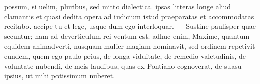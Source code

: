 possum, si uelim, pluribus, sed mitto dialectica. ipsas litteras longe aliud clamantis et quasi dedita opera ad iudicium istud praeparatas et accommodatas recitabo. accipe tu et lege, usque dum ego interloquar. — Sustine paulisper quae secuntur; nam ad deverticulum rei ventum est. adhuc enim, Maxime, quantum equidem animadverti, nusquam mulier magiam nominavit, sed ordinem repetivit eundem, quem ego paulo prius, de longa viduitate, de remedio valetudinis, de voluntate nubendi, de meis laudibus, quas ex Pontiano cognoverat, de suasu ipsius, ut mihi potissimum nuberet.
